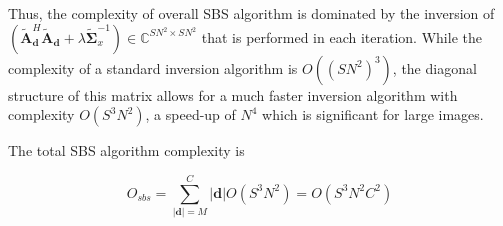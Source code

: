 \documentclass{article}
\begin{document}
Thus, the complexity of overall SBS algorithm is dominated by the inversion
of $\left( \widetilde{\bm A}_{\bm d}^H \widetilde{\bm A}_{\bm d} +
\lambda \widetilde{\bm \Sigma}_x^{-1} \right) \in \mathbb C ^{SN^2 \times SN^2}$
that is performed in each iteration.  While the complexity of a standard inversion algorithm
is $O((SN^2)^3)$, the diagonal structure of this matrix allows for a much faster inversion algorithm
with complexity $O(S^3N^2)$, a speed-up of $N^4$ which is significant for large images.

The total SBS algorithm complexity is

$$
O_{sbs} = \sum_{|\bm{d}| = M}^C |\bm{d}| O(S^3N^2) = O(S^3N^2C^2)
$$


\end{document}
